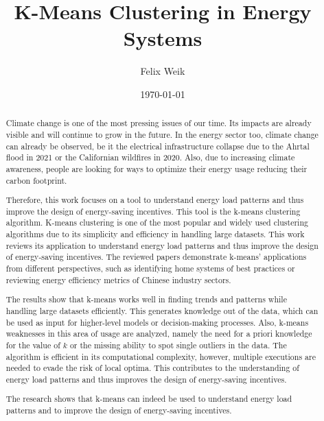 \documentclass{revtex4-2}
\begin{document}
\title{K-Means Clustering in Energy Systems}
\author{Felix Weik}
\date{\today}


\begin{abstract}
Climate change is one of the most pressing issues of our time. 
Its impacts are already visible and will continue to grow in the future.
In the energy sector too, climate change can already be observed, be it the electrical infrastructure collapse due to the Ahrtal flood in 2021 or the Californian wildfires in 2020.
Also, due to increasing climate awareness, people are looking for ways to optimize their energy usage reducing their carbon footprint.

Therefore, this work focuses on a tool to understand energy load patterns and thus improve the design of energy-saving incentives.
This tool is the k-means clustering algorithm.
K-means clustering is one of the most popular and widely used clustering algorithms due to its simplicity and efficiency in handling large datasets.
This work reviews its application to understand energy load patterns and thus improve the design of energy-saving incentives.
The reviewed papers demonstrate k-means' applications from different perspectives, such as identifying home systems of best practices or reviewing energy efficiency metrics of Chinese industry sectors.

The results show that k-means works well in finding trends and patterns while handling large datasets efficiently.
This generates knowledge out of the data, which can be used as input for higher-level models or decision-making processes.
Also, k-means weaknesses in this area of usage are analyzed, namely the need for a priori knowledge for the value of $k$ or the missing ability to spot single outliers in the data.
The algorithm is efficient in its computational complexity, however, multiple executions are needed to evade the risk of local optima.
This contributes to the understanding of energy load patterns and thus improves the design of energy-saving incentives.

The research shows that k-means can indeed be used to understand energy load patterns and to improve the design of energy-saving incentives.
\end{abstract}
\end{document}

